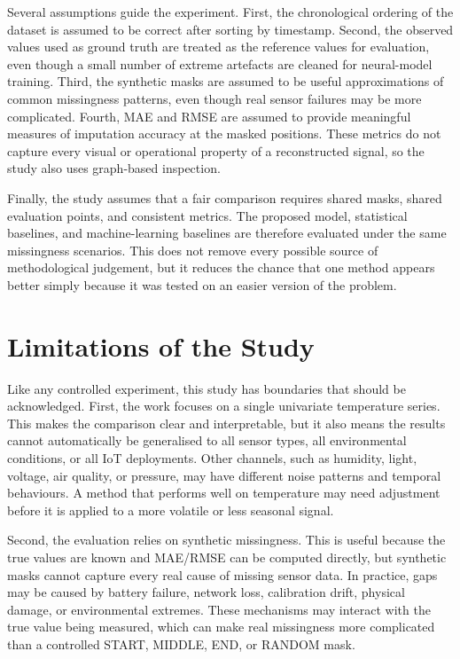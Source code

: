 Several assumptions guide the experiment. First, the chronological ordering of the dataset is assumed to be correct after sorting by timestamp. Second, the observed values used as ground truth are treated as the reference values for evaluation, even though a small number of extreme artefacts are cleaned for neural-model training. Third, the synthetic masks are assumed to be useful approximations of common missingness patterns, even though real sensor failures may be more complicated. Fourth, MAE and RMSE are assumed to provide meaningful measures of imputation accuracy at the masked positions. These metrics do not capture every visual or operational property of a reconstructed signal, so the study also uses graph-based inspection.

Finally, the study assumes that a fair comparison requires shared masks, shared evaluation points, and consistent metrics. The proposed model, statistical baselines, and machine-learning baselines are therefore evaluated under the same missingness scenarios. This does not remove every possible source of methodological judgement, but it reduces the chance that one method appears better simply because it was tested on an easier version of the problem.

\section{Limitations of the Study}
Like any controlled experiment, this study has boundaries that should be acknowledged. First, the work focuses on a single univariate temperature series. This makes the comparison clear and interpretable, but it also means the results cannot automatically be generalised to all sensor types, all environmental conditions, or all IoT deployments. Other channels, such as humidity, light, voltage, air quality, or pressure, may have different noise patterns and temporal behaviours. A method that performs well on temperature may need adjustment before it is applied to a more volatile or less seasonal signal.

Second, the evaluation relies on synthetic missingness. This is useful because the true values are known and MAE/RMSE can be computed directly, but synthetic masks cannot capture every real cause of missing sensor data. In practice, gaps may be caused by battery failure, network loss, calibration drift, physical damage, or environmental extremes. These mechanisms may interact with the true value being measured, which can make real missingness more complicated than a controlled START, MIDDLE, END, or RANDOM mask.

